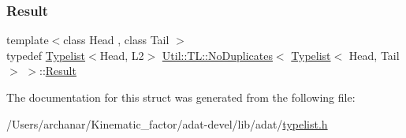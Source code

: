 \subsubsection{\texorpdfstring{Result}{Result}\hspace{0.1cm}{\footnotesize\ttfamily [3/3]}}
{\footnotesize\ttfamily template$<$class Head , class Tail $>$ \\
typedef \mbox{\hyperlink{structUtil_1_1Typelist}{Typelist}}$<$Head, L2$>$ \mbox{\hyperlink{structUtil_1_1TL_1_1NoDuplicates}{Util\+::\+T\+L\+::\+No\+Duplicates}}$<$ \mbox{\hyperlink{structUtil_1_1Typelist}{Typelist}}$<$ Head, Tail $>$ $>$\+::\mbox{\hyperlink{structUtil_1_1TL_1_1NoDuplicates_3_01Typelist_3_01Head_00_01Tail_01_4_01_4_ada564784f87c4684be2e13c5e1bf722e}{Result}}}



The documentation for this struct was generated from the following file\+:\begin{DoxyCompactItemize}
\item 
/\+Users/archanar/\+Kinematic\+\_\+factor/adat-\/devel/lib/adat/\mbox{\hyperlink{adat-devel_2lib_2adat_2typelist_8h}{typelist.\+h}}\end{DoxyCompactItemize}
